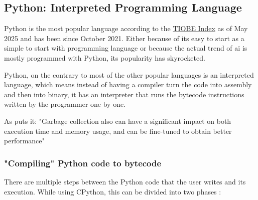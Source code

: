 \subsection{Python: Interpreted Programming Language}
Python is the most popular language according to the \href{https://www.tiobe.com/tiobe-index/}{TIOBE Index} as of May 2025 and has been since October 2021. Either because of its easy to start as a simple to start with programming language or because the actual trend of \gls{ai} is mostly programmed with Python, its popularity has skyrocketed.

Python, on the contrary to most of the other popular languages is an interpreted language, which means instead of having a compiler turn the code into assembly and then into binary, it has an interpreter that runs the \gls{bytecode} instructions written by the programmer one by one.

As \cite{10.1145/1103845.1094836} puts it: "Garbage collection also can have a significant impact on both execution time and memory usage, and can be fine-tuned to obtain better performance"

\subsubsection{"Compiling" Python code to \gls{bytecode}}
There are multiple steps between the Python code that the user writes and its execution. While using \gls{CPython}, this can be divided into two phases \cite{cpython-docs}:





